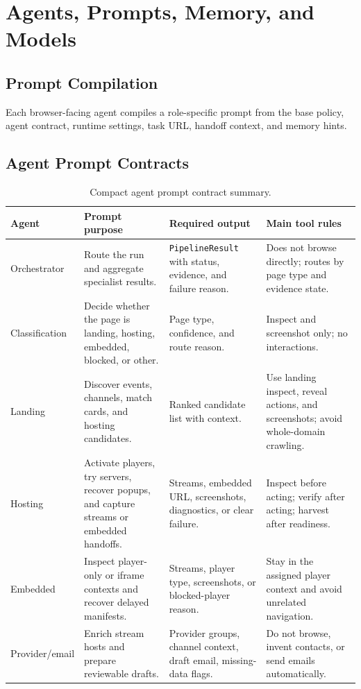 

\section{Agents, Prompts, Memory, and Models}

\subsection{Prompt Compilation}

Each browser-facing agent compiles a role-specific prompt from the base policy,
agent contract, runtime settings, task URL, handoff context, and memory hints.



\subsection{Agent Prompt Contracts}

\begin{table}[!htbp]
\centering
\begin{tabularx}{\textwidth}{Q{2.8cm} Y Y Y}
\toprule
{}
Agent & Prompt purpose & Required output & Main tool rules \\
\midrule
Orchestrator & Route the run and aggregate specialist results. &
\texttt{PipelineResult} with status, evidence, and failure reason. & Does not
browse directly; routes by page type and evidence state. \\
Classification & Decide whether the page is landing, hosting, embedded,
blocked, or other. & Page type, confidence, and route reason. & Inspect and
screenshot only; no interactions. \\
Landing & Discover events, channels, match cards, and hosting candidates. &
Ranked candidate list with context. & Use landing inspect, reveal actions, and
screenshots; avoid whole-domain crawling. \\
Hosting & Activate players, try servers, recover popups, and capture streams or
embedded handoffs. & Streams, embedded URL, screenshots, diagnostics, or clear
failure. & Inspect before acting; verify after acting; harvest after readiness. \\
Embedded & Inspect player-only or iframe contexts and recover delayed manifests.
& Streams, player type, screenshots, or blocked-player reason. & Stay in the
assigned player context and avoid unrelated navigation. \\
Provider/email & Enrich stream hosts and prepare reviewable drafts. & Provider
groups, channel context, draft email, missing-data flags. & Do not browse,
invent contacts, or send emails automatically. \\
\bottomrule
\end{tabularx}
\caption{Compact agent prompt contract summary.}
\label{tab:agent-prompt-contract-summary}
\end{table}

